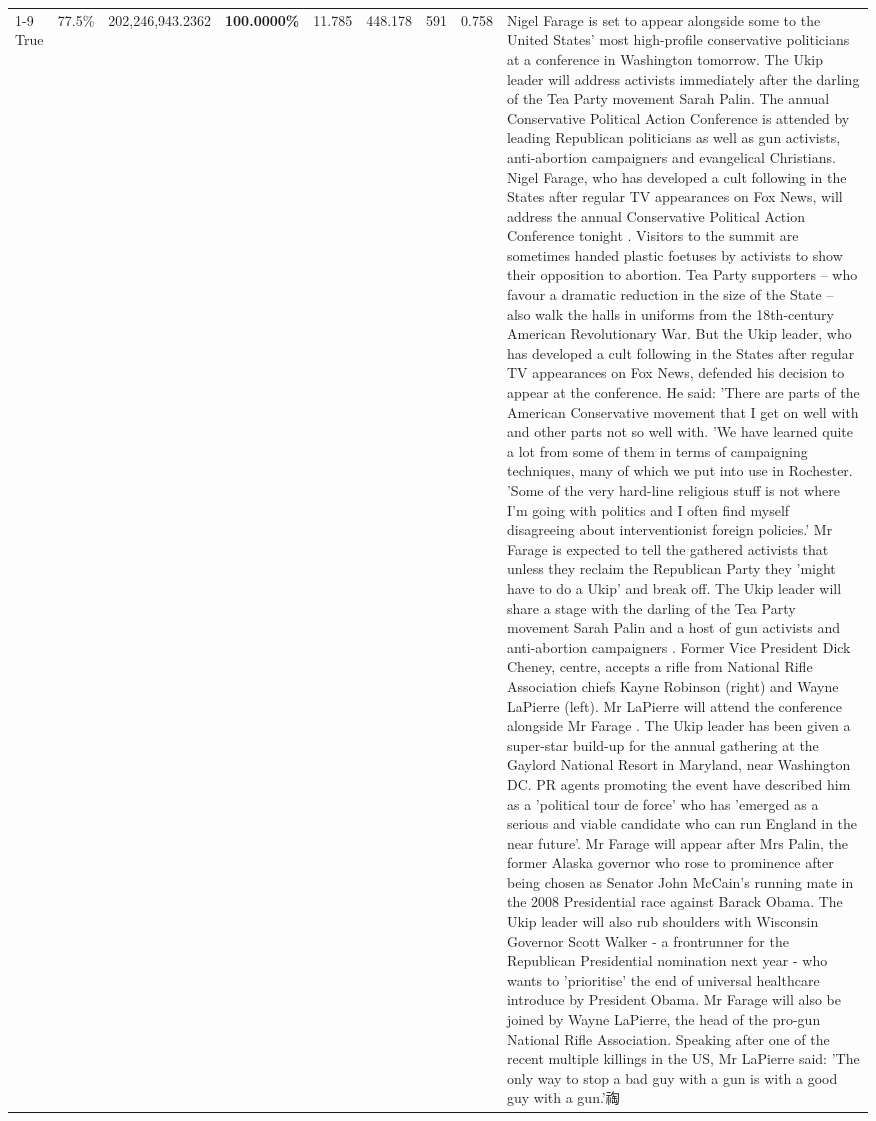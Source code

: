 \begin{table}[H]
\begin{tabular}{lllrlllll}
\cline{1-9}
True & 77.5\% & 202,246,943.2362 & \bfseries \color{red} 100.0000\% & 11.785 & 448.178 & 591 & 0.758 & Nigel Farage is set to appear alongside some to the United States' most high-profile conservative politicians at a conference in Washington tomorrow. The Ukip leader will address activists immediately after the darling of the Tea Party movement Sarah Palin. The annual Conservative Political Action Conference is attended by leading Republican politicians as well as gun activists, anti-abortion campaigners and evangelical Christians. Nigel Farage, who has developed a cult following in the States after regular TV appearances on Fox News, will address the annual Conservative Political Action Conference tonight . Visitors to the summit are sometimes handed plastic foetuses by activists to show their opposition to abortion. Tea Party supporters – who favour a dramatic reduction in the size of the State – also walk the halls in uniforms from the 18th-century American Revolutionary War. But the Ukip leader, who has developed a cult following in the States after regular TV appearances on Fox News, defended his decision to appear at the conference. He said: 'There are parts of the American Conservative movement that I get on well with and other parts not so well with. 'We have learned quite a lot from some of them in terms of campaigning techniques, many of which we put into use in Rochester. 'Some of the very hard-line religious stuff is not where I'm going with politics and I often find myself disagreeing about interventionist foreign policies.' Mr Farage is expected to tell the gathered activists that unless they reclaim the Republican Party they 'might have to do a Ukip' and break off. The Ukip leader will share a stage with the darling of the Tea Party movement Sarah Palin and a host of gun activists and anti-abortion campaigners . Former Vice President Dick Cheney, centre, accepts a rifle from National Rifle Association chiefs Kayne Robinson (right) and Wayne LaPierre (left). Mr LaPierre will attend the conference alongside Mr Farage . The Ukip leader has been given a super-star build-up for the annual gathering at the Gaylord National Resort in Maryland, near Washington DC. PR agents promoting the event have described him as a 'political tour de force' who has 'emerged as a serious and viable candidate who can run England in the near future'. Mr Farage will appear after Mrs Palin, the former Alaska governor who rose to prominence after being chosen as Senator John McCain's running mate in the 2008 Presidential race against Barack Obama. The Ukip leader will also rub shoulders with Wisconsin Governor Scott Walker - a frontrunner for the Republican Presidential nomination next year - who wants to 'prioritise' the end of universal healthcare introduce by President Obama. Mr Farage will also be joined by Wayne LaPierre, the head of the pro-gun National Rifle Association. Speaking after one of the recent multiple killings in the US, Mr LaPierre said: 'The only way to stop a bad guy with a gun is with a good guy with a gun.'祹 \\

\end{tabular}
\end{table}
